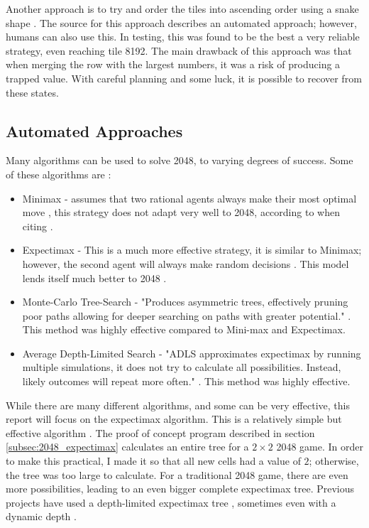 \documentclass{article}
\begin{document}
Another approach is to try and order the tiles into ascending order using a snake shape \cite{aiplays2048}. The source for this approach describes an automated approach; however,
humans can also use this. In testing, this was found to be the best a very reliable strategy, even reaching tile 8192. The main drawback of this approach was that when merging the row with the largest numbers, it was a risk of producing a trapped value. With careful planning and some luck, it is possible to recover from these states.
\subsection{Automated Approaches}
\label{subsec:automated_techniques}
Many algorithms can be used to solve 2048, to varying degrees of success. Some of these algorithms are \cite{approches2048}:
\begin{itemize}
    \item Minimax - assumes that two rational agents always make their most optimal move \cite{minmaxCS2910}, this strategy does not adapt very well to 2048, according to \cite{approches2048} when citing \cite{minmax2048}.
    \item Expectimax - This is a much more effective strategy, it is similar to Minimax; however, the second agent will always make random decisions \cite[p.~200]{russell2010artificial}. This model lends itself much better to 2048 \cite{expectimax2048}.
    \item Monte-Carlo Tree-Search - "Produces asymmetric trees, effectively pruning poor paths allowing for deeper searching on paths with greater potential." \cite{approches2048}. This method was highly effective compared to Mini-max and Expectimax.
    \item Average Depth-Limited Search - "ADLS approximates expectimax by running multiple simulations, it does not try to calculate all possibilities. Instead, likely outcomes will repeat more often." \cite {approches2048}. This method was highly effective.
\end{itemize}
While there are many different algorithms, and some can be very effective, this report will focus on the expectimax algorithm. This is a relatively simple but effective algorithm \cite{expectimax2048}. The proof of concept program described in section \ref{subsec:2048_expectimax} calculates an entire tree for a $2\times2$ 2048 game. In order to make this practical, I made it so that all new cells had a value of $2$; otherwise, the tree was too large to calculate. For a traditional 2048 game, there are even more possibilities, leading to an even bigger complete expectimax tree. Previous projects have used a depth-limited expectimax tree \cite{aiplays2048}, sometimes even with a dynamic depth \cite{expectimax2048}.
\end{document}
